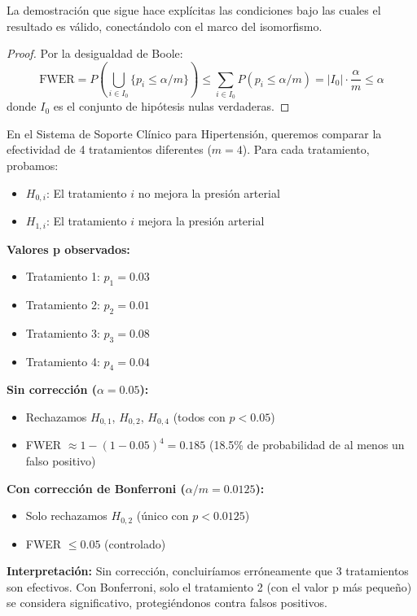 La demostración que sigue hace explícitas las condiciones bajo las cuales
el resultado es válido, conectándolo con el marco del isomorfismo.

\begin{proof}
	Por la desigualdad de Boole:
	\[
		\text{FWER} = P\left(\bigcup_{i \in I_0} \{p_i \leq \alpha/m\}\right)
		\leq \sum_{i \in I_0} P(p_i \leq \alpha/m) = |I_0| \cdot \frac{\alpha}{m} \leq \alpha
	\]
	donde $I_0$ es el conjunto de hipótesis nulas verdaderas.
\end{proof}

\begin{example}
\label{ex:ch4-bonferroni-ssch}
En el Sistema de Soporte Clínico para Hipertensión, queremos comparar la efectividad de 4 tratamientos diferentes ($m=4$). Para cada tratamiento, probamos:
\begin{itemize}
	\item $H_{0,i}$: El tratamiento $i$ no mejora la presión arterial
	\item $H_{1,i}$: El tratamiento $i$ mejora la presión arterial
	      \end{itemize}

\textbf{Valores p observados:}
\begin{itemize}
	\item Tratamiento 1: $p_1 = 0.03$
	\item Tratamiento 2: $p_2 = 0.01$
	\item Tratamiento 3: $p_3 = 0.08$
	\item Tratamiento 4: $p_4 = 0.04$
\end{itemize}

\textbf{Sin corrección ($\alpha = 0.05$):}
\begin{itemize}
	\item Rechazamos $H_{0,1}$, $H_{0,2}$, $H_{0,4}$ (todos con $p < 0.05$)
	\item FWER $\approx 1 - (1-0.05)^4 = 0.185$ (18.5\% de probabilidad de al menos un falso positivo)
\end{itemize}

\textbf{Con corrección de Bonferroni ($\alpha/m = 0.0125$):}
\begin{itemize}
	\item Solo rechazamos $H_{0,2}$ (único con $p < 0.0125$)
	\item FWER $\leq 0.05$ (controlado)
\end{itemize}

\textbf{Interpretación:} Sin corrección, concluiríamos erróneamente que 3 tratamientos son efectivos. Con Bonferroni, solo el tratamiento 2 (con el valor p más pequeño) se considera significativo, protegiéndonos contra falsos positivos.
\end{example}

